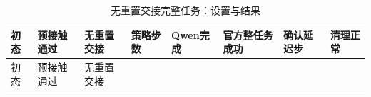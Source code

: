\FloatBarrier\begingroup\small\setlength{\tabcolsep}{2.5pt}
\begin{longtable}[]{@{}
  >{\raggedleft\arraybackslash}p{}
  >{\raggedright\arraybackslash}p{}
  >{\raggedright\arraybackslash}p{}
  >{\raggedleft\arraybackslash}p{}
  >{\raggedright\arraybackslash}p{}
  >{\raggedright\arraybackslash}p{}
  >{\raggedleft\arraybackslash}p{}
  >{\raggedright\arraybackslash}p{}@{}}
\caption{无重置交接完整任务：设置与结果}\label{tab:s20-1}\tabularnewline
\toprule\noalign{}
\begin{minipage}[b]{\linewidth}\raggedleft
初态
\end{minipage} & \begin{minipage}[b]{\linewidth}\raggedright
预接触通过
\end{minipage} & \begin{minipage}[b]{\linewidth}\raggedright
无重置交接
\end{minipage} & \begin{minipage}[b]{\linewidth}\raggedleft
策略步数
\end{minipage} & \begin{minipage}[b]{\linewidth}\raggedright
Qwen完成
\end{minipage} & \begin{minipage}[b]{\linewidth}\raggedright
官方整任务成功
\end{minipage} & \begin{minipage}[b]{\linewidth}\raggedleft
确认延迟步
\end{minipage} & \begin{minipage}[b]{\linewidth}\raggedright
清理正常
\end{minipage} \\
\midrule\noalign{}
\endfirsthead
\toprule\noalign{}
\begin{minipage}[b]{\linewidth}\raggedleft
初态
\end{minipage} & \begin{minipage}[b]{\linewidth}\raggedright
预接触通过
\end{minipage} & \begin{minipage}[b]{\linewidth}\raggedright
无重置交接
\end{minipage} & \begin{minipage}[b]{\linewidth}\raggedleft

\end{minipage}
\end{longtable}

